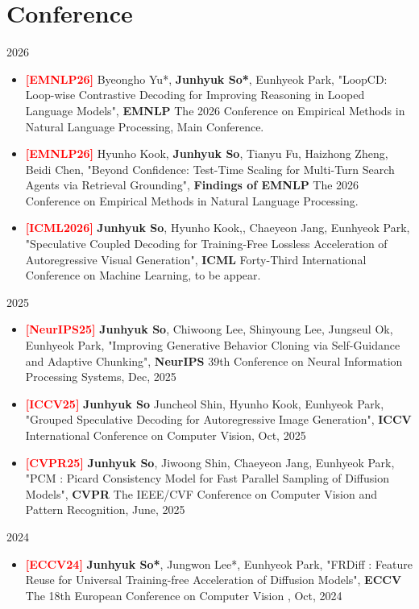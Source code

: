 \documentclass[a4paper,20pt]{article}
\begin{document}
\section{Conference}
2026
\begin{itemize}
    \item \textcolor{red}{\textbf{[EMNLP26]}} Byeongho Yu*, \textbf{Junhyuk So*}, Eunhyeok Park, "LoopCD: Loop-wise Contrastive Decoding for Improving Reasoning in Looped Language Models", \textbf{EMNLP} The 2026 Conference on Empirical Methods in Natural Language Processing, Main Conference.
    \item \textcolor{red}{\textbf{[EMNLP26]}} Hyunho Kook, \textbf{Junhyuk So}, Tianyu Fu, Haizhong Zheng, Beidi Chen, "Beyond Confidence: Test-Time Scaling for Multi-Turn Search Agents via Retrieval Grounding", \textbf{Findings of EMNLP} The 2026 Conference on Empirical Methods in Natural Language Processing.
    \item \textcolor{red}{\textbf{[ICML2026]}} \textbf{Junhyuk So}, Hyunho Kook,, Chaeyeon Jang, Eunhyeok Park, "Speculative Coupled Decoding for Training-Free Lossless Acceleration of Autoregressive Visual Generation", \textbf{ICML} Forty-Third International Conference on Machine Learning, to be appear.
\end{itemize}
2025
\begin{itemize}
        \item \textcolor{red}{\textbf{[NeurIPS25]}} \textbf{Junhyuk So}, Chiwoong Lee, Shinyoung Lee, Jungseul Ok, Eunhyeok Park, "Improving Generative Behavior Cloning via Self-Guidance and Adaptive Chunking", \textbf{NeurIPS} 39th Conference on Neural Information Processing Systems, Dec, 2025
        \item \textcolor{red}{\textbf{[ICCV25]}} \textbf{Junhyuk So} Juncheol Shin, Hyunho Kook, Eunhyeok Park, "Grouped Speculative Decoding for Autoregressive Image Generation", \textbf{ICCV} International Conference on Computer Vision, Oct, 2025
        \item \textcolor{red}{\textbf{[CVPR25]}} \textbf{Junhyuk So}, Jiwoong Shin, Chaeyeon Jang, Eunhyeok Park, "PCM : Picard Consistency Model for Fast Parallel Sampling of Diffusion Models", \textbf{CVPR} The IEEE/CVF Conference on Computer Vision and Pattern Recognition, June, 2025
\end{itemize}
2024
\begin{itemize}
    \item \textcolor{red}{\textbf{[ECCV24]}} \textbf{Junhyuk So*}, Jungwon Lee*, Eunhyeok Park, "FRDiff : Feature Reuse for Universal Training-free Acceleration of Diffusion Models", \textbf{ECCV} The 18th European Conference on Computer Vision , Oct, 2024
\end{itemize}
\end{document}

